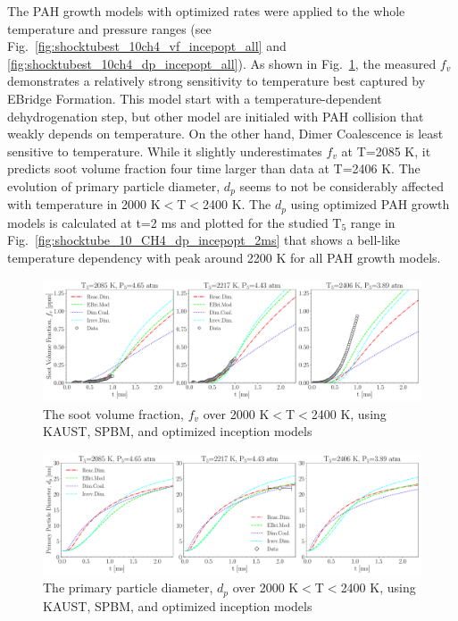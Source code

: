 The PAH growth models with optimized rates were applied to the whole temperature and pressure ranges (see Fig.~\ref{fig:shocktubest_10ch4_vf_incepopt_all} and \ref{fig:shocktubest_10ch4_dp_incepopt_all}). As shown in Fig.~\ref{fig:shocktube_10_CH4_vf_incepopt}, the measured $f_v$ demonstrates a relatively strong sensitivity to temperature best captured by EBridge Formation. This model start with a temperature-dependent dehydrogenation step, but other model are initialed with PAH collision that weakly depends on temperature. On the other hand, Dimer Coalescence is least sensitive to temperature. While it slightly underestimates $f_v$ at T=2085 K, it predicts soot volume fraction four time larger than data at T=2406 K. The evolution of primary particle diameter, $d_p$ seems to not be considerably affected with temperature in 2000 K$<$T$<$2400 K. The $d_p$ using optimized PAH growth models is calculated at t=2 ms and plotted for the studied $\mathrm{T_5}$ range in Fig.~\ref{fig:shocktube_10_CH4_dp_incepopt_2ms} that shows a bell-like temperature dependency with peak around 2200 K for all PAH growth models.

\begin{figure}[H]
	\centering
	\includegraphics[width=1\textwidth]{Figures/Results/Shocktube/Stanford/September/10CH4_vf_pahopt_subset.pdf}
	\caption{The soot volume fraction, $f_v$ over 2000 K$<$T$<$2400 K, using KAUST, SPBM, and optimized inception models}
	\label{fig:shocktube_10_CH4_vf_incepopt} 
\end{figure}


\begin{figure}[H]
	\centering
	\includegraphics[width=1\textwidth]{Figures/Results/Shocktube/Stanford/September/10CH4_dp_pahopt_subset.pdf}
	\caption{The primary particle diameter, $d_p$ over 2000 K$<$T$<$2400 K, using KAUST, SPBM, and optimized inception models}
	\label{fig:shocktube_10_CH4_dp_incepopt} 
\end{figure}


